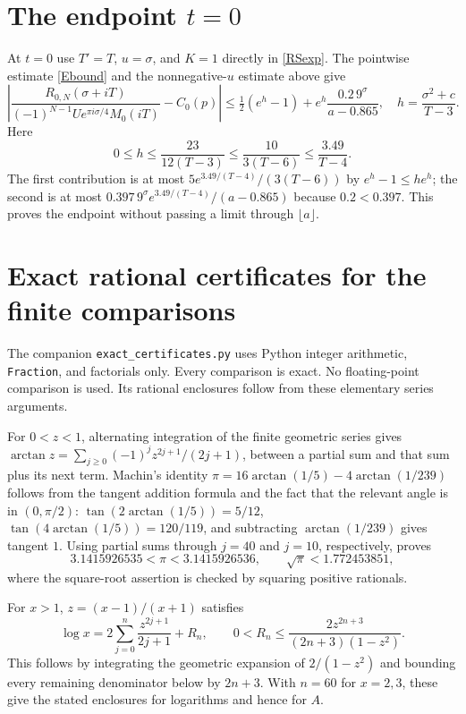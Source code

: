 \documentclass[11pt]{article}
\begin{document}
\section{The endpoint $t=0$}

At $t=0$ use $T'=T$, $u=\sigma$, and $K=1$ directly in
\eqref{RSexp}. The pointwise estimate \eqref{Ebound} and the
nonnegative-$u$ estimate above give
\[
 \left|\frac{R_{0,N}(\sigma+iT)}
 {(-1)^{N-1}Ue^{\pi i\sigma/4}M_0(iT)}-C_0(p)\right|
 \le\tfrac12(e^h-1)+e^h\frac{0.2\,9^\sigma}{a-0.865},
 \quad h=\frac{\sigma^2+c}{T-3}.
\]
Here
\[
 0\le h\le\frac{23}{12(T-3)}
 \le\frac{10}{3(T-6)}\le\frac{3.49}{T-4}.
\]
The first contribution is at most
$5e^{3.49/(T-4)}/(3(T-6))$ by $e^h-1\le he^h$;
the second is at most
$0.397\,9^\sigma e^{3.49/(T-4)}/(a-0.865)$ because $0.2<0.397$.
This proves the endpoint without passing a limit through $\lfloor a\rfloor$.

\section{Exact rational certificates for the finite comparisons}

The companion \texttt{exact\_certificates.py} uses Python integer
arithmetic, \texttt{Fraction}, and factorials only. Every comparison
is exact. No floating-point comparison is used. Its rational
enclosures follow from these elementary series arguments.

For $0<z<1$, alternating integration of the finite geometric series
gives
$\arctan z=\sum_{j\ge0}(-1)^jz^{2j+1}/(2j+1)$,
between a partial sum and that sum plus its next term. Machin's
identity $\pi=16\arctan(1/5)-4\arctan(1/239)$ follows from
the tangent addition formula and the fact that the relevant angle
is in $(0,\pi/2)$: $\tan(2\arctan(1/5))=5/12$,
$\tan(4\arctan(1/5))=120/119$, and subtracting
$\arctan(1/239)$ gives tangent $1$. Using partial sums through
$j=40$ and $j=10$, respectively, proves
\[
 3.1415926535<\pi<3.1415926536,
 \qquad \sqrt\pi<1.772453851,
\]
where the square-root assertion is checked by squaring positive
rationals.

For $x>1$, $z=(x-1)/(x+1)$ satisfies
\[
 \log x=2\sum_{j=0}^n\frac{z^{2j+1}}{2j+1}+R_n,
 \qquad 0<R_n\le\frac{2z^{2n+3}}{(2n+3)(1-z^2)}.
\]
This follows by integrating the geometric expansion of
$2/(1-z^2)$ and bounding every remaining denominator below by
$2n+3$. With $n=60$ for $x=2,3$, these give the stated enclosures
for logarithms and hence for $A$.
\end{document}
